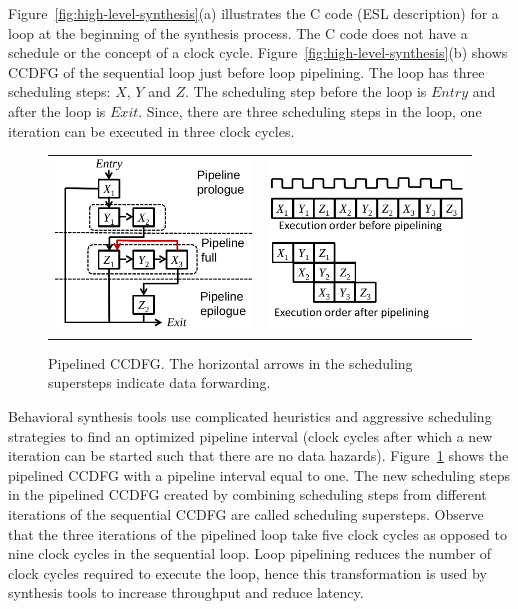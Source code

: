 Figure~\ref{fig:high-level-synthesis}(a) illustrates the C
code (ESL description) for a loop at the beginning of the
synthesis process. The C code does not have a schedule or the
concept of a clock cycle. Figure~\ref{fig:high-level-synthesis}(b)
shows CCDFG of the sequential loop just before loop pipelining. The loop has three scheduling steps: $X$, $Y$ and $Z$.  The scheduling step before the loop is $Entry$ and after the loop is $Exit$. Since,
there are three scheduling steps in the loop, one iteration
can be executed in three clock cycles.

\begin{figure}
\begin{center}
\begin{tabular}{cc}
\includegraphics[height=1.8in]{fig-rpe/pipelined_ccdfg}
& \hspace{0.5cm}
\includegraphics[height=1.8in]{fig-rpe/pp-clock-cycles}
\end{tabular}
\end{center}
\caption{Pipelined CCDFG. The horizontal arrows in the scheduling supersteps indicate data forwarding.}
\label{fig:pp-ccdfg}
\end{figure}

Behavioral synthesis tools use complicated heuristics and aggressive scheduling strategies to find an optimized pipeline interval (clock cycles after which a new iteration can be started such that there are no data hazards). Figure~\ref{fig:pp-ccdfg} shows the pipelined CCDFG with a pipeline interval equal to one. The new scheduling steps in the pipelined CCDFG created by combining scheduling steps from different iterations of the sequential CCDFG are called scheduling supersteps. Observe that the three iterations of the pipelined loop take five clock cycles as opposed to nine clock cycles in the sequential loop. Loop pipelining reduces the number of clock cycles required to execute the loop, hence this transformation is used by synthesis tools to increase throughput and reduce latency.  

